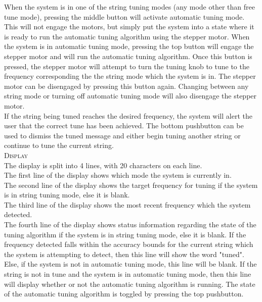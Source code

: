 \documentclass[aps,letterpaper,10pt]{revtex4}
\begin{document}
When the system is in one of the string tuning modes (any mode other than free tune mode), pressing the middle button will activate automatic tuning mode. This will not engage the motors, but simply put the system into a state where it is ready to run the automatic tuning algorithm using the stepper motor. When the system is in automatic tuning mode, pressing the top button will engage the stepper motor and will run the automatic tuning algorithm. Once this button is pressed, the stepper motor will attempt to turn the tuning knob to tune to the frequency corresponding the the string mode which the system is in. The stepper motor can be disengaged by pressing this button again. Changing between any string mode or turning off automatic tuning mode will also disengage the stepper motor. \\

If the string being tuned reaches the desired frequency, the system will alert the user that the correct tune has been achieved. The bottom pushbutton can be used to dismiss the tuned message and either begin tuning another string or continue to tune the current string. \\

\textsc{Display} \\

The display is split into 4 lines, with 20 characters on each line. \\

The first line of the display shows which mode the system is currently in. \\

The second line of the display shows the target frequency for tuning if the system is in string tuning mode, else it is blank. \\

The third line of the display shows the most recent frequency which the system detected. \\

The fourth line of the display shows status information regarding the state of the tuning algorithm if the system is in string tuning mode, else it is blank. If the frequency detected falls within the accuracy bounds for the current string which the system is attempting to detect, then this line will show the word "tuned". Else, if the system is not in automatic tuning mode, this line will be blank. If the string is not in tune and the system is in automatic tuning mode, then this line will display whether or not the automatic tuning algorithm is running. The state of the automatic tuning algorithm is toggled by pressing the top pushbutton. \\
\end{document}
